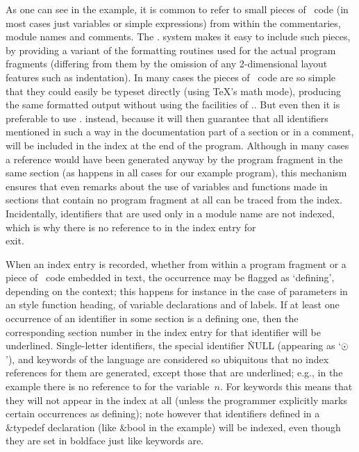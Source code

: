 As one can see in the example, it is common to refer to small pieces of
\Cee~code (in most cases just variables or simple expressions) from within
the commentaries, module names and comments. The \CWEB. system makes it easy
to include such pieces, by providing a variant of the formatting routines
used for the actual program fragments (differing from them by the omission
of any 2-dimensional layout features such as indentation). In many cases the
pieces of \Cee~code are so simple that they could easily be typeset directly
(using \TeX's math mode), producing the same formatted output without using
the facilities of \CWEB.. But even then it is preferable to use \CWEB.
instead, because it will then guarantee that all identifiers mentioned in
such a way in the documentation part of a section or in a comment, will be
included in the index at the end of the program. Although in many cases a
reference would have been generated anyway by the program fragment in the
same section (as happens in all cases for our example program), this
mechanism ensures that even remarks about the use of variables and functions
made in sections that contain no program fragment at all can be traced from
the index. Incidentally, identifiers that are used only in a module name are
not indexed, which is why there is no reference to  in the index entry
for~\\{exit}.

When an index entry is recorded, whether from within a program fragment or a
piece of \Cee~code embedded in text, the occurrence may be flagged as
`defining', depending on the context; this happens for instance in the case
of parameters in an  style function heading, of variable
declarations and of labels. If at least one occurrence of an identifier in
some section is a defining one, then the corresponding section number in the
index entry for that identifier will be underlined. Single-letter
identifiers, the special identifier \.{NULL} (appearing as `$\odot$'), and
keywords of the language are considered so ubiquitous that no index
references for them are generated, except those that are underlined; e.g.,
in the example there is no reference to  for the variable~$n$. For
keywords this means that they will not appear in the index at all (unless
the programmer explicitly marks certain occurrences as defining); note
however that identifiers defined in a \&{typedef} declaration (like \&{bool}
in the example) will be indexed, even though they are set in boldface just
like keywords are.

